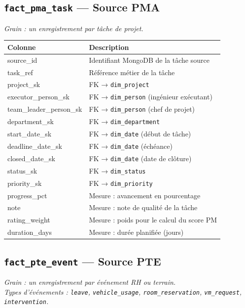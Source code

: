 \documentclass[a4paper,12pt]{article}
\begin{document}
\subsection{\texttt{fact\_pma\_task} — Source PMA}

\textit{Grain : un enregistrement par tâche de projet.}

\begin{tabularx}{\textwidth}{>{\ttfamily\footnotesize}p{4.5cm} >{\footnotesize}X}
\toprule
\textbf{Colonne} & \textbf{Description} \\
\midrule
source\_id              & Identifiant MongoDB de la tâche source \\
task\_ref               & Référence métier de la tâche \\
project\_sk             & FK → \texttt{dim\_project} \\
executor\_person\_sk    & FK → \texttt{dim\_person} (ingénieur exécutant) \\
team\_leader\_person\_sk& FK → \texttt{dim\_person} (chef de projet) \\
department\_sk          & FK → \texttt{dim\_department} \\
start\_date\_sk         & FK → \texttt{dim\_date} (début de tâche) \\
deadline\_date\_sk      & FK → \texttt{dim\_date} (échéance) \\
closed\_date\_sk        & FK → \texttt{dim\_date} (date de clôture) \\
status\_sk              & FK → \texttt{dim\_status} \\
priority\_sk            & FK → \texttt{dim\_priority} \\
progress\_pct           & Mesure : avancement en pourcentage \\
note                    & Mesure : note de qualité de la tâche \\
rating\_weight          & Mesure : poids pour le calcul du score PM \\
duration\_days          & Mesure : durée planifiée (jours) \\
\bottomrule
\end{tabularx}

\subsection{\texttt{fact\_pte\_event} — Source PTE}

\textit{Grain : un enregistrement par événement RH ou terrain.}\\
\textit{Types d'événements : \texttt{leave}, \texttt{vehicle\_usage}, \texttt{room\_reservation},
\texttt{vm\_request}, \texttt{intervention}.}
\end{document}
